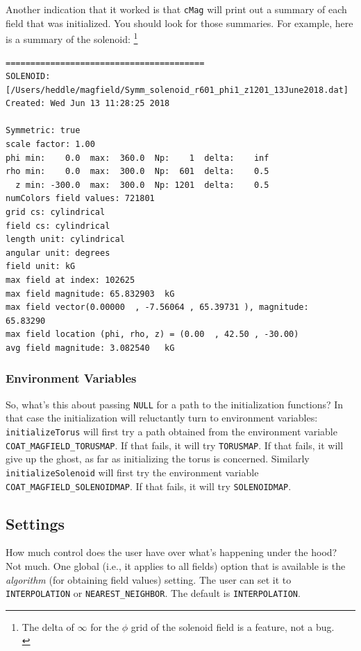 \documentclass{article}
\begin{document}
Another indication that it worked is that \texttt{cMag} will print out a summary of each field that was initialized. You should look for those summaries. For example, here is a summary of the solenoid:
\footnote{The delta of $\infty$ for the $\phi$ grid of the solenoid field is a feature, not a bug.\\}

\begin{verbatim} 
========================================
SOLENOID: [/Users/heddle/magfield/Symm_solenoid_r601_phi1_z1201_13June2018.dat]
Created: Wed Jun 13 11:28:25 2018

Symmetric: true
scale factor: 1.00  
phi min:    0.0  max:  360.0  Np:    1  delta:    inf
rho min:    0.0  max:  300.0  Np:  601  delta:    0.5
  z min: -300.0  max:  300.0  Np: 1201  delta:    0.5
numColors field values: 721801
grid cs: cylindrical
field cs: cylindrical
length unit: cylindrical
angular unit: degrees
field unit: kG
max field at index: 102625
max field magnitude: 65.832903  kG
max field vector(0.00000  , -7.56064 , 65.39731 ), magnitude:     65.83290
max field location (phi, rho, z) = (0.00  , 42.50 , -30.00)
avg field magnitude: 3.082540   kG
\end{verbatim}

\subsubsection{Environment Variables}
So, what's this about passing \texttt{NULL} for a path to the initialization functions? In that case the initialization will reluctantly turn to environment variables: \texttt{initializeTorus}  will first try a path obtained from the environment variable \texttt{COAT\_MAGFIELD\_TORUSMAP}. If that fails, it will try \texttt{TORUSMAP}. If that fails, it will give up the ghost, as far as initializing the torus is concerned. Similarly \texttt{initializeSolenoid} will first try the environment variable \texttt{COAT\_MAGFIELD\_SOLENOIDMAP}. If that fails, it will try \texttt{SOLENOIDMAP}. 

\subsection{Settings}
How much control does the user have over what's happening under the hood? Not much. One global (i.e., it applies to all fields) option that is available is the \textit{algorithm} (for obtaining field values) setting. The user can set it to \texttt{INTERPOLATION} or \texttt{NEAREST\_NEIGHBOR}. The default is \texttt{INTERPOLATION}. 
\end{document}
